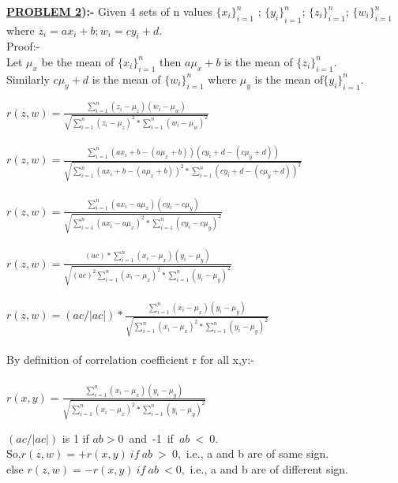 \documentclass[a4paper]{article}
\begin{document}
\begin{flushleft}
\Large{\textbf{\underline{PROBLEM 2}):-}}
\Large{
Given 4 sets of n values ${\{x_i\}}_{i=1}^n$ ; ${\{y_i\}}_{i=1}^n$; ${\{z_i\}}_{i=1}^n$; ${\{w_i\}}_{i=1}^n$ where $z_i=ax_i+b;w_i=cy_i+d.$
}\\
Proof:-\\
Let $\mu_x$ be the mean of ${\{x_i\}}_{i=1}^n$ then $a\mu_x+b$ is the mean of ${\{z_i\}}_{i=1}^n$.\\
Similarly $c\mu_y+d$ is the mean of ${\{w_i\}}_{i=1}^n$ where $\mu_y$ is the mean of${\{y_i\}}_{i=1}^n$.\\
\begin{center}
\LARGE{
$r(z,w)=\frac{\sum_{i=1}^n (z_i-\mu_z)(w_i-\mu_w)}{\sqrt{\sum_{i=1}^n (z_i-\mu_z)^2*\sum_{i=1}^n (w_i-\mu_w)^2}}$
\\ \ \\
$r(z,w)=\frac{\sum_{i=1}^n (ax_i+b-(a\mu_x+b)) (cy_i+d-(c\mu_y+d))}{\sqrt{\sum_{i=1}^n (ax_i+b-(a\mu_x+b))^2*\sum_{i=1}^n (cy_i+d-(c\mu_y+d))^2}}$
\\ \ \\
$r(z,w)=\frac{\sum_{i=1}^n (ax_i-a\mu_x)(cy_i-c\mu_y)}{\sqrt{\sum_{i=1}^n (ax_i-a\mu_x)^2*\sum_{i=1}^n (cy_i-c\mu_y)^2}}$
\\ \ \\
$r(z,w)=\frac{(ac)*\sum_{i=1}^n (x_i-\mu_x)(y_i-\mu_y)}{\sqrt{(ac)^2\sum_{i=1}^n (x_i-\mu_x)^2*\sum_{i=1}^n (y_i-\mu_y)^2}}$
\\ \ \\
$r(z,w)=(ac/|ac|)*\frac{\sum_{i=1}^n (x_i-\mu_x)(y_i-\mu_y)}{\sqrt{\sum_{i=1}^n (x_i-\mu_x)^2*\sum_{i=1}^n (y_i-\mu_y)^2}}$
}\\ \ \\
By definition of correlation coefficient r for all x,y:-\\ \ \\
$r(x,y)=\frac{\sum_{i=1}^n (x_i-\mu_x)(y_i-\mu_y)}{\sqrt{\sum_{i=1}^n (x_i-\mu_x)^2*\sum_{i=1}^n (y_i-\mu_y)^2}}$
\end{center}
$(ac/|ac|)$ is 1 if $ab > 0$\ and\ -1\ if\ $ab\ <\ 0$.\\
So,$r(z,w)=+r(x,y)\ if\ ab\ >\ 0,$ i.e., a and b are of same sign. \\
else $r(z,w)=-r(x,y)\ if\ ab\ < 0,$ i.e., a and b are of different sign.\\ \ \\
\end{flushleft}
\newpage
\end{document}
